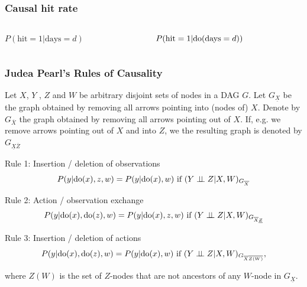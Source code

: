 \begin{frame}
\frametitle{Causal hit rate}
\begin{columns}[T] %
    \begin{column}{.48\textwidth}
    $P(\textrm{hit}=1 | \textrm{days}=d)$\newline
    
    
    \end{column}%
    \begin{column}{.48\textwidth}
        $P(\textrm{hit}=1 | \mathrm{do}(\textrm{days}=d))$\newline
        
          

         \end{column}%
    \end{columns}

\end{frame}

\begin{frame}
\frametitle{Judea Pearl's Rules of Causality}

Let $X$, $Y$ , $Z$ and $W$ be arbitrary disjoint sets of nodes in a DAG $G$. Let $G_\underline{X}$ be the graph obtained by removing all arrows pointing into (nodes of) $X$. 
Denote by $G_{\overline{X}}$ the graph obtained by removing all arrows pointing out of $X$. If, e.g. we remove arrows pointing out of $X$ and into $Z$, we the resulting graph is denoted by $G_{\underline{X} \overline{Z}}$

Rule 1: Insertion / deletion of observations
\begin{equation*}
P(y | \mathrm{do}(x), z, w) = P(y | \mathrm{do}(x), w) \textrm{ if } (Y \perp\!\!\!\perp Z | X, W)_{G_{\overline{X}}}
\end{equation*}

Rule 2: Action / observation exchange
\begin{equation*}
P(y | \mathrm{do}(x), \mathrm{do}(z), w) = P(y | \mathrm{do}(x), z, w) \textrm{ if } (Y \perp\!\!\!\perp Z | X, W)_{G_{\overline{X} \underline{Z}}}
\end{equation*}

Rule 3: Insertion / deletion of actions
\begin{equation*}
P(y | \mathrm{do}(x), \mathrm{do}(z), w) = P(y | \mathrm{do}(x), w) \textrm{ if } (Y \perp\!\!\!\perp Z | X, W)_{G_{\overline{X} \overline{Z(W)}}},
\end{equation*}

where $Z(W)$ is the set of $Z$-nodes that are not ancestors of any $W$-node in $G_\underline{X}$.

\end{frame}


